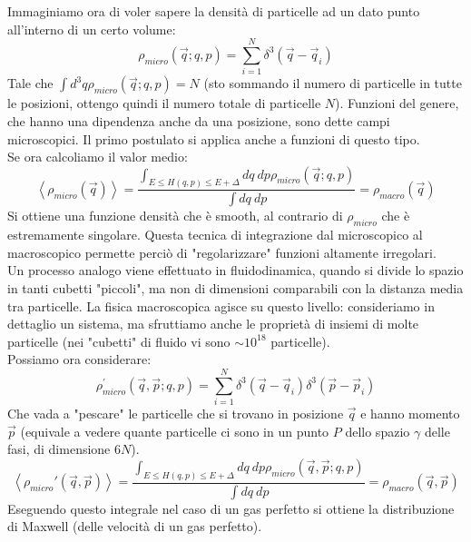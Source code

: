 \documentclass[../MeccanicaStatistica.tex]{subfiles}
\begin{document}
Immaginiamo ora di voler sapere la densità di particelle ad un dato punto all'interno di un certo volume:
\[
\rho_{micro}\left(\vec{q};q,p\right)=\sum_{i=1}^{N}{\delta^3\left(\vec{q}-{\vec{q}}_i\right)}
\]
Tale che $\int d^3q  \rho_{micro}\left(\vec{q};q,p\right)=N$ (sto sommando il numero di particelle in tutte le posizioni, ottengo quindi il numero totale di particelle $N$).
Funzioni del genere, che hanno una dipendenza anche da una posizione, sono dette campi microscopici. Il primo postulato si applica anche a funzioni di questo tipo.\\
Se ora calcoliamo il valor medio:
\[
\left\langle\rho_{micro}(\vec{q})\right\rangle=\frac{\int_{E\le H\left(q,p\right)\le E+\Delta}{dq\ dp}\rho_{micro}\left(\vec{q};q,p\right)}{\int{dq\ dp}}= \rho_{macro}(\vec{q})
\]
Si ottiene una funzione densità che è smooth, al contrario di $\rho_{micro}$ che è estremamente singolare. Questa tecnica di integrazione dal microscopico al macroscopico permette perciò di "regolarizzare" funzioni altamente irregolari.\\
Un processo analogo viene effettuato in fluidodinamica, quando si divide lo spazio in tanti cubetti "piccoli", ma non di dimensioni comparabili con la distanza media tra particelle. La fisica macroscopica agisce su questo livello: consideriamo in dettaglio un sistema, ma sfruttiamo anche le proprietà di insiemi di molte particelle (nei "cubetti" di fluido vi sono ${\sim 10}^{18}$ particelle).\\

Possiamo ora considerare:
\[
\rho_{micro}^\prime\left(\vec{q},\vec{p};q,p\right)= \sum_{i=1}^{N}{\delta^3\left(\vec{q}-{\vec{q}}_i\right)\delta^3(\vec{p}-{\vec{p}}_i)}
\]
Che vada a "pescare" le particelle che si trovano in posizione $\vec{q}$ e hanno momento $\vec{p}$ (equivale a vedere quante particelle ci sono in un punto $P$ dello spazio $\gamma$ delle fasi, di dimensione $6N$).
\[
\left\langle\rho_{micro}\prime(\vec{q},\vec{p})\right\rangle=\frac{\int_{E\le H\left(q,p\right)\le E+\Delta}{dq\ dp}\rho_{micro}\left(\vec{q},\vec{p};q,p\right)}{\int{dq\ dp}}=\rho_{macro}(\vec{q},\vec{p})
\]
Eseguendo questo integrale nel caso di un gas perfetto si ottiene la  distribuzione di Maxwell (delle velocità di un gas perfetto).
\end{document}
